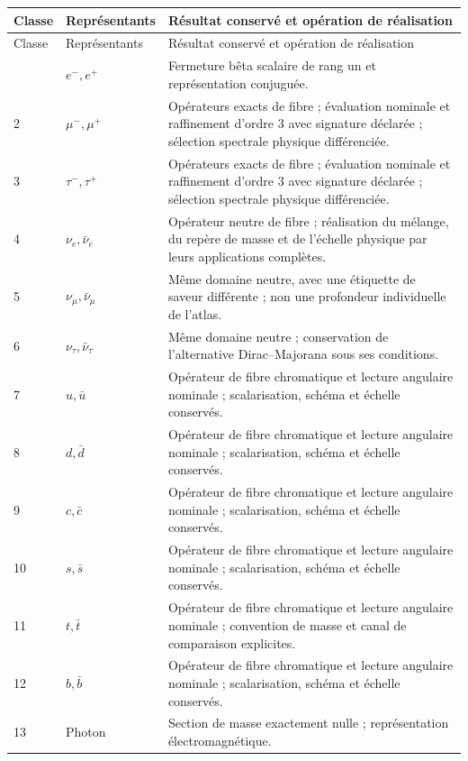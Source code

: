 \begin{longtable}{@{}p{.11\linewidth}p{.20\linewidth}p{.62\linewidth}@{}}
 \toprule
 Classe&Représentants&Résultat conservé et opération de réalisation\\
 \midrule\endfirsthead
 \toprule Classe&Représentants&Résultat conservé et opération de réalisation\\
 \midrule\endhead
 \bottomrule\endfoot
 1&\(e^-,e^+\)&Fermeture bêta scalaire de rang un et représentation conjuguée.\\
 2&\(\mu^-,\mu^+\)&Opérateurs exacts de fibre ; évaluation nominale et raffinement d’ordre \(3\) avec signature déclarée ; sélection spectrale physique différenciée.\\
 3&\(\tau^-,\tau^+\)&Opérateurs exacts de fibre ; évaluation nominale et raffinement d’ordre \(3\) avec signature déclarée ; sélection spectrale physique différenciée.\\
 4&\(\nu_e,\bar\nu_e\)&Opérateur neutre de fibre ; réalisation du mélange, du repère de masse et de l’échelle physique par leurs applications complètes.\\
 5&\(\nu_\mu,\bar\nu_\mu\)&Même domaine neutre, avec une étiquette de saveur différente ; non une profondeur individuelle de l’atlas.\\
 6&\(\nu_\tau,\bar\nu_\tau\)&Même domaine neutre ; conservation de l’alternative Dirac--Majorana sous ses conditions.\\
 7&\(u,\bar u\)&Opérateur de fibre chromatique et lecture angulaire nominale ; scalarisation, schéma et échelle conservés.\\
 8&\(d,\bar d\)&Opérateur de fibre chromatique et lecture angulaire nominale ; scalarisation, schéma et échelle conservés.\\
 9&\(c,\bar c\)&Opérateur de fibre chromatique et lecture angulaire nominale ; scalarisation, schéma et échelle conservés.\\
 10&\(s,\bar s\)&Opérateur de fibre chromatique et lecture angulaire nominale ; scalarisation, schéma et échelle conservés.\\
 11&\(t,\bar t\)&Opérateur de fibre chromatique et lecture angulaire nominale ; convention de masse et canal de comparaison explicites.\\
 12&\(b,\bar b\)&Opérateur de fibre chromatique et lecture angulaire nominale ; scalarisation, schéma et échelle conservés.\\
 13&Photon&Section de masse exactement nulle ; représentation électromagnétique.\\

\end{longtable}
